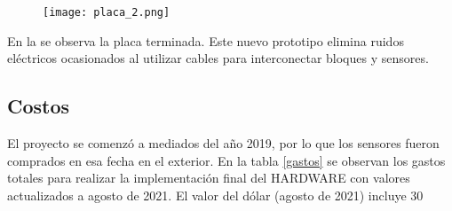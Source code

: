 \begin{figure}[h!]
	\centering
	\texttt{[image: placa\_2.png]}
	\label{fig:hardBloq}
\end{figure}

En la  se observa la placa terminada. Este nuevo prototipo elimina ruidos eléctricos ocasionados al utilizar cables para interconectar bloques y sensores.







\subsection{Costos}
El proyecto se comenzó a mediados del año 2019, por lo que los sensores fueron comprados en esa fecha en el exterior. En la tabla \ref{gastos} se observan los gastos totales para realizar la implementación final del HARDWARE con valores actualizados a agosto de 2021. El valor del dólar (agosto de 2021) incluye 30%



